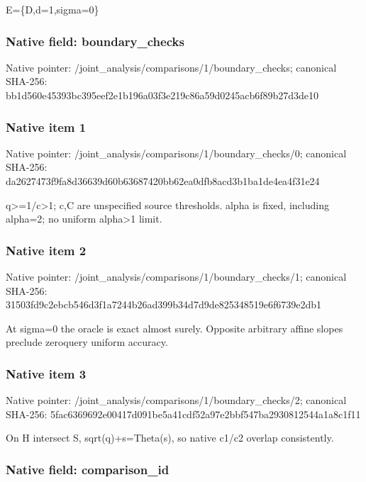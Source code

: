 \documentclass[10pt,a4paper]{article}
\begin{document}
E=\{D,d=1,sigma=0\}


\subsubsection{Native field: boundary\_checks}


Native pointer: /joint\_analysis/comparis\allowbreak{}ons/1/boundary\_checks; canonical SHA-256: bb1d560e45393bc395eef2e1\allowbreak{}b196a03f3e219c86a59d0245\allowbreak{}acb6f89b27d3de10



\subsubsection{Native item 1}


Native pointer: /joint\_analysis/comparis\allowbreak{}ons/1/boundary\_checks/0; canonical SHA-256: da2627473f9fa8d36639d60b\allowbreak{}63687420bb62ea0dfb8acd3b\allowbreak{}1ba1de4ea4f31e24


q>=1/c>1; c,C are unspecified source thresholds. alpha is fixed, including alpha=2; no uniform alpha>1 limit.


\subsubsection{Native item 2}


Native pointer: /joint\_analysis/comparis\allowbreak{}ons/1/boundary\_checks/1; canonical SHA-256: 31503fd9c2ebcb546d3f1a72\allowbreak{}44b26ad399b34d7d9de82534\allowbreak{}8519e6f6739e2db1


At sigma=0 the oracle is exact almost surely. Opposite arbitrary affine slopes preclude zeroquery uniform accuracy.


\subsubsection{Native item 3}


Native pointer: /joint\_analysis/comparis\allowbreak{}ons/1/boundary\_checks/2; canonical SHA-256: 5fac6369692e00417d091be5\allowbreak{}a41cdf52a97e2bbf547ba293\allowbreak{}0812544a1a8c1f11


On H intersect S, sqrt(q)+s=Theta(s), so native c1/c2 overlap consistently.


\subsubsection{Native field: comparison\_id}
\end{document}
